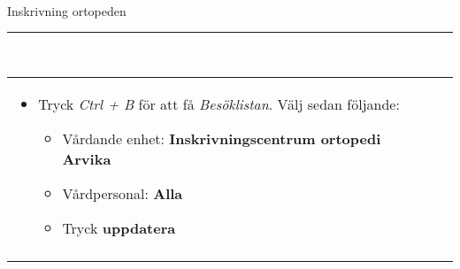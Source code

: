 \documentclass[13pt,a4paper,oneside]{article}
\begin{document}
{
\ \\
Inskrivning ortopeden\hrule
\ \\
\begin{tabular}{ l l }
 \begin{minipage}{12cm} \begin{itemize}
  \item Tryck \textit{Ctrl + B} för att få \textit{Besöklistan}. Välj sedan följande:
\begin{itemize}
  \item Vårdande enhet: \textbf{Inskrivningscentrum ortopedi Arvika}
  \item Vårdpersonal: \textbf{Alla}
  \item Tryck \textbf{uppdatera}
\end{itemize}\end{itemize} \end{minipage} &  \begin{minipage}{12cm}\end{minipage} \\ 
  \begin{minipage}{12cm}\begin{itemize}


\end{itemize}
\end{minipage}
\end{tabular}}
\end{document}
